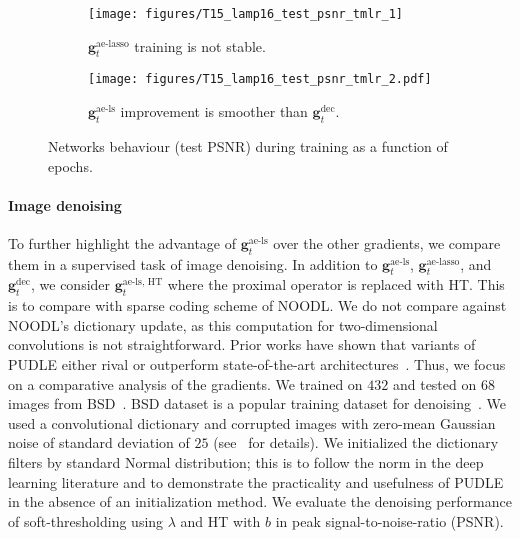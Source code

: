 \documentclass[10pt]{article} %
\newcommand{\g}{{\bm g}}
\begin{document}
%
\begin{figure}[h]
	\centering
	\begin{subfigure}[t]{0.45\linewidth}
	\centering
	\texttt{[image: figures/T15\_lamp16\_test\_psnr\_tmlr\_1]}
	  \caption{$\g_t^{\text{ae-lasso}}$ training is not stable.}
  	\label{fig:psnr_1}
	\end{subfigure}
	\begin{subfigure}[t]{0.45\linewidth}
	\centering
	\texttt{[image: figures/T15\_lamp16\_test\_psnr\_tmlr\_2.pdf]}
	  \caption{$\g_t^{\text{ae-ls}}$ improvement is smoother than  $\g_t^{\text{dec}}$.}
  	\label{fig:psnr_2}
	\end{subfigure}
	\caption{Networks behaviour (test PSNR) during training as a function of epochs.}
	\label{fig:psnr}
	\vspace{-2mm}
\end{figure}
%

\paragraph{Image denoising} To further highlight the advantage of $\g_t^{\text{ae-ls}}$ over the other gradients, we compare them in a supervised task of image denoising. In addition to $\g_t^{\text{ae-ls}}$, $\g_t^{\text{ae-lasso}}$, and $\g_t^{\text{dec}}$, we consider $\g_t^{\text{ae-ls, HT}}$ where the proximal operator is replaced with HT. This is to compare with sparse coding scheme of NOODL. We do not compare against NOODL's dictionary update, as this computation for two-dimensional convolutions is not straightforward. Prior works have shown that variants of PUDLE either rival or outperform state-of-the-art architectures~\citep{simon2019rethinking,tolooshams2020icml}. Thus, we focus on a comparative analysis of the gradients. We trained on $432$ and tested on $68$ images from BSD~\citep{martin2001bsd}. BSD dataset is a popular training dataset for denoising~\citep{zhang2017beyond, simon2019rethinking, mohan2019robust}. We used a convolutional dictionary and corrupted images with zero-mean Gaussian noise of standard deviation of $25$ (see~ for details). We initialized the dictionary filters by standard Normal distribution; this is to follow the norm in the deep learning literature and to demonstrate the practicality and usefulness of PUDLE in the absence of an initialization method. We evaluate the denoising performance of soft-thresholding using $\lambda$ and HT with $b$ in peak signal-to-noise-ratio (PSNR).
\end{document}
